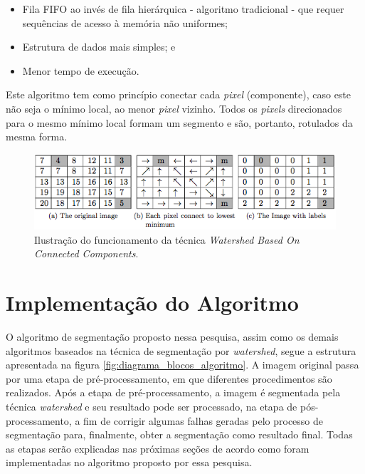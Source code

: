 \begin{itemize}
    \item Fila FIFO ao invés de fila hierárquica - algoritmo tradicional - que requer sequências de acesso à memória não uniformes;
    \item Estrutura de dados mais simples; e
    \item Menor tempo de execução.
\end{itemize}    

Este algoritmo tem como princípio conectar cada \textit{pixel} (componente), caso este não seja o mínimo local, ao menor \textit{pixel} vizinho. Todos os \textit{pixels} direcionados para o mesmo mínimo local formam um segmento e são, portanto, rotulados da mesma forma.

	\begin{figure}[!htb]
       \begin{center}  
          \includegraphics[width=0.9\columnwidth]{img/connected_components.jpg}
           \caption{\label{fig:connected_components}Ilustração do funcionamento da técnica \textit{Watershed Based On Connected Components}. \cite{ruparelia2012implementation}}
       \end{center}
   \end{figure}

\section{Implementação do Algoritmo}\label{sec:alg}

O algoritmo de segmentação proposto nessa pesquisa, assim como os demais algoritmos baseados na técnica de segmentação por \textit{watershed}, segue a estrutura apresentada na figura \ref{fig:diagrama_blocos_algoritmo}. A imagem original passa por uma etapa de pré-processamento, em que diferentes procedimentos são realizados. Após a etapa de pré-processamento, a imagem é segmentada pela técnica \textit{watershed} e seu resultado pode ser processado, na etapa de pós-processamento, a fim de corrigir algumas falhas geradas pelo processo de segmentação para, finalmente, obter a segmentação como resultado final.
Todas as etapas serão explicadas nas próximas seções de acordo como foram implementadas no algoritmo proposto por essa pesquisa.

